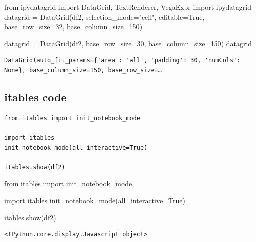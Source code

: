 \documentclass[
  letterpaper,
  DIV=11,
  numbers=noendperiod]{scrartcl}
\newenvironment{Shaded}{\begin{snugshade}}{\end{snugshade}}
\newcommand{\DecValTok}[1]{\textcolor[rgb]{0.68,0.00,0.00}{#1}}
\newcommand{\ImportTok}[1]{\textcolor[rgb]{0.00,0.46,0.62}{#1}}
\newcommand{\NormalTok}[1]{\textcolor[rgb]{0.00,0.23,0.31}{#1}}
\newcommand{\OperatorTok}[1]{\textcolor[rgb]{0.37,0.37,0.37}{#1}}
\newcommand{\StringTok}[1]{\textcolor[rgb]{0.13,0.47,0.30}{#1}}
\newcommand{\VariableTok}[1]{\textcolor[rgb]{0.07,0.07,0.07}{#1}}
\begin{document}
\begin{Shaded}
\begin{Highlighting}[]
\ImportTok{from}\NormalTok{ ipydatagrid }\ImportTok{import}\NormalTok{ DataGrid, TextRenderer, VegaExpr}
\ImportTok{import}\NormalTok{ ipydatagrid}
\NormalTok{datagrid }\OperatorTok{=}\NormalTok{ DataGrid(df2, selection\_mode}\OperatorTok{=}\StringTok{"cell"}\NormalTok{, editable}\OperatorTok{=}\VariableTok{True}\NormalTok{,}
\NormalTok{                   base\_row\_size}\OperatorTok{=}\DecValTok{32}\NormalTok{, base\_column\_size}\OperatorTok{=}\DecValTok{150}\NormalTok{)}

\NormalTok{datagrid }\OperatorTok{=}\NormalTok{ DataGrid(df2, base\_row\_size}\OperatorTok{=}\DecValTok{30}\NormalTok{, base\_column\_size}\OperatorTok{=}\DecValTok{150}\NormalTok{)}
\NormalTok{datagrid}
\end{Highlighting}
\end{Shaded}

\begin{verbatim}
DataGrid(auto_fit_params={'area': 'all', 'padding': 30, 'numCols': None}, base_column_size=150, base_row_size=…
\end{verbatim}

\hypertarget{itables-code}{%
\subsection{itables code}\label{itables-code}}

\begin{verbatim}
from itables import init_notebook_mode

import itables
init_notebook_mode(all_interactive=True)

itables.show(df2)
\end{verbatim}

\begin{Shaded}
\begin{Highlighting}[]
\ImportTok{from}\NormalTok{ itables }\ImportTok{import}\NormalTok{ init\_notebook\_mode}

\ImportTok{import}\NormalTok{ itables}
\NormalTok{init\_notebook\_mode(all\_interactive}\OperatorTok{=}\VariableTok{True}\NormalTok{)}

\NormalTok{itables.show(df2)}
\end{Highlighting}
\end{Shaded}

\begin{verbatim}
<IPython.core.display.Javascript object>
\end{verbatim}
\end{document}

